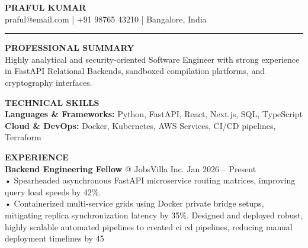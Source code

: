 \documentclass[10pt,letterpaper]{article}
\begin{document}
\begin{center}
{\Huge \bf PRAFUL KUMAR} \\
\vspace{1.5mm}
praful@email.com | +91 98765 43210 | Bangalore, India
\end{center}

\hrule
\vspace{3mm}

{\large \bf PROFESSIONAL SUMMARY} \\
\vspace{1.5mm}
Highly analytical and security-oriented Software Engineer with strong experience in FastAPI Relational Backends, sandboxed compilation platforms, and cryptography interfaces.

\vspace{3.0mm}
{\large \bf TECHNICAL SKILLS} \\
\vspace{1.5mm}
\textbf{Languages & Frameworks:} Python, FastAPI, React, Next.js, SQL, TypeScript \\
\textbf{Cloud & DevOps:} Docker, Kubernetes, AWS Services, CI/CD pipelines, Terraform

\vspace{3.0mm}
{\large \bf EXPERIENCE} \\
\vspace{2mm}
\textbf{Backend Engineering Fellow} @ JobsVilla Inc. \hfill Jan 2026 -- Present \\
• Spearheaded asynchronous FastAPI microservice routing matrices, improving query load speeds by 42\%. \\
• Containerized multi-service grids using Docker private bridge setups, mitigating replica synchronization latency by 35\%.
Designed and deployed robust, highly scalable automated pipelines to created ci cd pipelines, reducing manual deployment timelines by 45%
\end{document}
